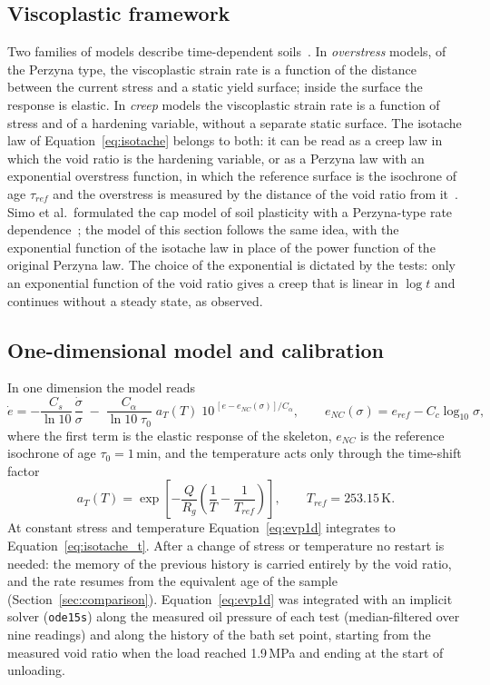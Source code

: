 \subsection{Viscoplastic framework}
\label{subsec:evp_framework}

Two families of models describe time-dependent soils~\cite{perzyna1966,yin1989,vermeer1999}. In \emph{overstress} models, of the Perzyna type, the viscoplastic strain rate is a function of the distance between the current stress and a static yield surface; inside the surface the response is elastic. In \emph{creep} models the viscoplastic strain rate is a function of stress and of a hardening variable, without a separate static surface. The isotache law of Equation~\eqref{eq:isotache} belongs to both: it can be read as a creep law in which the void ratio is the hardening variable, or as a Perzyna law with an exponential overstress function, in which the reference surface is the isochrone of age $\tau_{ref}$ and the overstress is measured by the distance of the void ratio from it~\cite{yin1989}. Simo et al.\ formulated the cap model of soil plasticity with a Perzyna-type rate dependence~\cite{simo1988}; the model of this section follows the same idea, with the exponential function of the isotache law in place of the power function of the original Perzyna law. The choice of the exponential is dictated by the tests: only an exponential function of the void ratio gives a creep that is linear in $\log t$ and continues without a steady state, as observed.

\subsection{One-dimensional model and calibration}
\label{subsec:evp1d}

In one dimension the model reads
\begin{equation}
    \dot e = -\frac{C_s}{\ln10}\,\frac{\dot\sigma}{\sigma}
    \;-\; \frac{C_\alpha}{\ln10\;\tau_0}\;a_T(T)\;10^{\,[e - e_{NC}(\sigma)]/C_\alpha},
    \qquad e_{NC}(\sigma) = e_{ref} - C_c\log_{10}\sigma,
    \label{eq:evp1d}
\end{equation}
where the first term is the elastic response of the skeleton, $e_{NC}$ is the reference isochrone of age $\tau_0 = 1$\,min, and the temperature acts only through the time-shift factor
\begin{equation}
    a_T(T) = \exp\!\left[-\frac{Q}{R_g}\left(\frac{1}{T}-\frac{1}{T_{ref}}\right)\right], \qquad T_{ref} = 253.15\,\text{K}.
    \label{eq:aT}
\end{equation}
At constant stress and temperature Equation~\eqref{eq:evp1d} integrates to Equation~\eqref{eq:isotache_t}. After a change of stress or temperature no restart is needed: the memory of the previous history is carried entirely by the void ratio, and the rate resumes from the equivalent age of the sample (Section~\ref{sec:comparison}). Equation~\eqref{eq:evp1d} was integrated with an implicit solver (\texttt{ode15s}) along the measured oil pressure of each test (median-filtered over nine readings) and along the history of the bath set point, starting from the measured void ratio when the load reached 1.9\,MPa and ending at the start of unloading.

